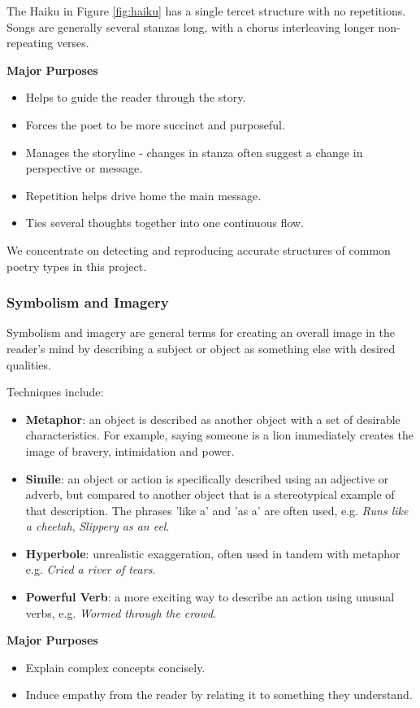 The Haiku in Figure \ref{fig:haiku} has a single tercet structure with no repetitions. Songs are generally several stanzas long, with a chorus interleaving longer non-repeating verses.

\textbf{Major Purposes}
\begin{itemize}
\item{Helps to guide the reader through the story.}
\item{Forces the poet to be more succinct and purposeful.}
\item{Manages the storyline - changes in stanza often suggest a change in perspective or message.}
\item{Repetition helps drive home the main message.}
\item{Ties several thoughts together into one continuous flow.}
\end{itemize} 

We concentrate on detecting and reproducing accurate structures of common poetry types in this project.

\subsubsection{Symbolism and Imagery}
Symbolism and imagery are general terms for creating an overall image in the reader's mind by describing a subject or object as something else with desired qualities.

Techniques include:
\begin{itemize}
\item{\textbf{Metaphor}: an object is described as another object with a set of desirable characteristics. For example, saying someone is a lion immediately creates the image of bravery, intimidation and power.}
\item{\textbf{Simile}: an object or action is specifically described using an adjective or adverb, but compared to another object that is a stereotypical example of that description. The phrases 'like a' and 'as a' are often used, e.g. \textit{Runs like a cheetah}, \textit{Slippery as an eel}.}
\item{\textbf{Hyperbole}: unrealistic exaggeration, often used in tandem with metaphor e.g. \textit{Cried a river of tears}.}
\item{\textbf{Powerful Verb}: a more exciting way to describe an action using unusual verbs, e.g. \textit{Wormed through the crowd}.}
\end{itemize}

\textbf{Major Purposes}
\begin{itemize}
\item{Explain complex concepts concisely.}
\item{Induce empathy from the reader by relating it to something they understand.}
\end{itemize} 

